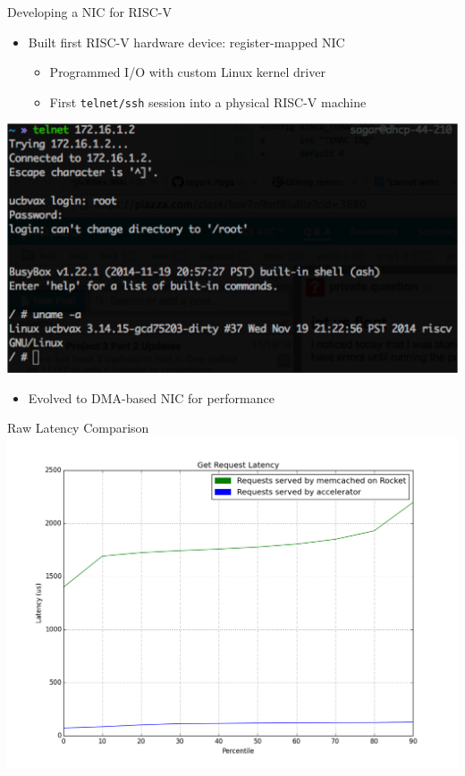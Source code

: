 \documentclass{beamer}
\begin{document}
\begin{frame}{Developing a NIC for RISC-V}
    \begin{itemize}
\item Built first RISC-V hardware device: register-mapped NIC
	\begin{itemize}
	\footnotesize
	\item Programmed I/O with custom Linux kernel driver
	\item First \texttt{telnet/ssh} session into a physical RISC-V machine
	\end{itemize}
\end{itemize}
\begin{center}
        \includegraphics[scale=0.3]{../img/first_telnet.png}
    \end{center}

\begin{itemize}
\item Evolved to DMA-based NIC for performance
\end{itemize}
\end{frame}



\begin{frame}{Raw Latency Comparison}
    \includegraphics[width=\linewidth]{../img/graph.png}
\end{frame}
\end{document}

